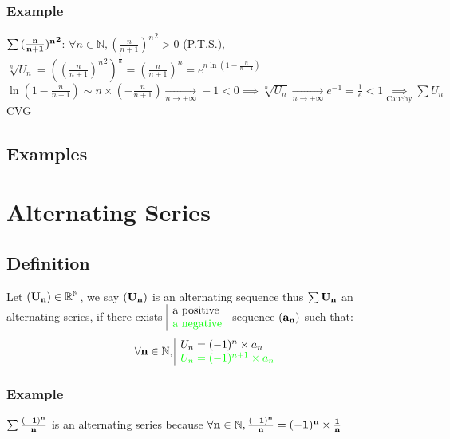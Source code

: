 \documentclass[notitlepage]{math}
\begin{document}
\subsubsection{Example}
$\bf \sum {(\frac{n}{n+1})^n}^2$: $\forall n \in \mathbb{N}, {(\frac{n}{n+1})^n}^2 > 0$ (P.T.S.), $\sqrt[n]{U_n} = \left({(\frac{n}{n+1})^n}^2\right)^{\frac{1}{n}} = (\frac{n}{n+1})^n = e^{n \ln(1 - \frac{n}{n+1})}$\\[0.2cm]
$\ln(1 - \frac{n}{n+1}) \sim n \times (-\frac{n}{n+1}) \xrightarrow[n \to +\infty]{} -1 < 0 \implies \sqrt[n]{U_n} \xrightarrow[n \to +\infty]{} e^{-1} = \frac{1}{e} < 1 \underset{\text{Cauchy}}{\implies} \sum U_n$ CVG\\
\subsection{Examples}
\section{Alternating Series}
\subsection{Definition}
Let $\bf (U_n) \in \mathbb{R}^\mathbb{N}$, we say $\bf (U_n)$ is an alternating sequence thus $\bf \sum U_n$ an alternating series, if there exists $\begin{array}{|l} \text{a positive} \\ \color{green}\text{a negative}\end{array}$ sequence $\bf (a_n)$ such that:
\[\bf \forall n \in \mathbb{N}, \begin{array}{|l} U_{n} = (-1)^n \times a_n \\ \color{green} U_{n} = (-1)^{n+1} \times a_n \end{array}\]
\subsubsection{Example}
$\bf \sum \frac{(-1)^n}{n}$ is an alternating series because $\bf \forall n \in \mathbb{N}, \frac{(-1)^n}{n} = (-1)^n \times \frac{1}{n}$
\end{document}
